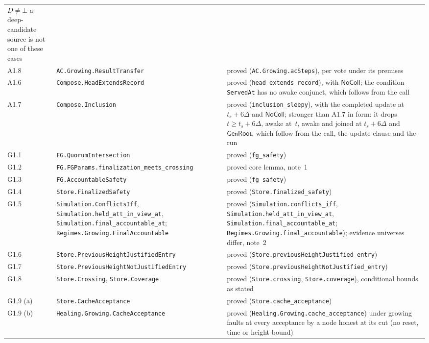 \documentclass{article}
\begin{document}
{\begin{longtable}{@{}>{\raggedright\arraybackslash}p{1.6cm}>{\raggedright\arraybackslash}p{6.2cm}>{\raggedright\arraybackslash}p{5.2cm}@{}}
  $D\neq\bot$ a deep-candidate source is not one of these cases\\
A1.8 & \texttt{AC.Growing.ResultTransfer} & proved (\texttt{AC.Growing.acSteps}), per vote under
  its premises\\
A1.6 & \texttt{Compose.HeadExtendsRecord} & proved
  (\texttt{head\_extends\_record}), with $\mathsf{NoColl}$; the condition
  \texttt{ServedAt} has no awake conjunct, which follows from the call\\
A1.7 & \texttt{Compose.Inclusion} & proved (\texttt{inclusion\_sleepy}),
  with the completed update at $t_s+6\Delta$ and $\mathsf{NoColl}$; stronger
  than A1.7 in form: it drops $t\geq t_s+6\Delta$, awake at~$t$, awake and
  joined at $t_s+6\Delta$ and $\mathsf{GenRoot}$, which follow from the
  call, the update clause and the run\\
G1.1 & \texttt{FG.QuorumIntersection} & proved (\texttt{fg\_safety})\\
G1.2 & \texttt{FG.FGParams.finalization\_meets\_crossing} & proved core
  lemma, note~1\\
G1.3 & \texttt{FG.AccountableSafety} & proved (\texttt{fg\_safety})\\
G1.4 & \texttt{Store.FinalizedSafety} & proved (\texttt{Store.finalized\_safety})\\
G1.5 & \texttt{Simulation.ConflictsIff}, \texttt{Simulation.held\_att\_in\_view\_at},
  \texttt{Simulation.final\_accountable\_at};
  \texttt{Regimes.Growing.FinalAccountable}
  & proved (\texttt{Simulation.conflicts\_iff},
  \texttt{Simulation.held\_att\_in\_view\_at},
  \texttt{Simulation.final\_accountable\_at};
  \texttt{Regimes.Growing.final\_accountable});
  evidence universes differ, note~2\\
G1.6 & \texttt{Store.PreviousHeightJustifiedEntry} & proved
  (\texttt{Store.previousHeightJustified\_entry})\\
G1.7 & \texttt{Store.PreviousHeightNotJustifiedEntry} & proved
  (\texttt{Store.previousHeightNotJustified\_entry})\\
G1.8 & \texttt{Store.Crossing}, \texttt{Store.Coverage} & proved
  (\texttt{Store.crossing}, \texttt{Store.coverage}), conditional bounds as
  stated\\
G1.9 (a) & \texttt{Store.CacheAcceptance} & proved
  (\texttt{Store.cache\_acceptance})\\
G1.9 (b) & \texttt{Healing.Growing.CacheAcceptance} & proved
  (\texttt{Healing.Growing.cache\_acceptance}) under growing faults at every
  acceptance by a node honest at its cut (no reset, time or height bound)\\

\end{longtable}}
\end{document}
